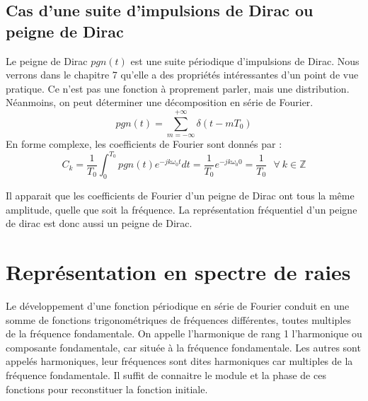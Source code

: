 	

	
	\subsection{Cas d'une suite d'impulsions de Dirac ou peigne de Dirac}
	
	Le peigne de Dirac $pgn(t)$ est une suite périodique d'impulsions de Dirac. Nous verrons dans le chapitre 7 qu'elle a des propriétés intéressantes d'un point de vue pratique. Ce n'est pas une fonction à proprement parler, mais une distribution. Néanmoins, on peut déterminer une décomposition en série de Fourier.
	\begin{equation}\label{exp_peigne_Dirac}
	pgn(t)=\sum_{m=-\infty}^{+\infty}\delta(t-mT_0)
	\end{equation}
	En forme complexe, les coefficients de Fourier sont donnés par :
	\begin{equation}\label{coef_Fourier_peigne_Dirac}
	C_k=\frac{1}{T_0}\int_{0}^{T_0}pgn(t)e^{-jk\omega_{0}t}dt=\frac{1}{T_0}e^{-jk\omega_{0}0}=\frac{1}{T_0}~~~\forall~k \in \mathbb{Z}
	\end{equation}
	
	Il apparait que les coefficients de Fourier d'un peigne de Dirac ont tous la même amplitude, quelle que soit la fréquence. La représentation fréquentiel d'un peigne de dirac est donc aussi un peigne de Dirac. \\
	
	
	
	\section{Représentation en spectre de raies}
	
	Le développement d'une fonction périodique en série de Fourier conduit en une somme de fonctions trigonométriques de fréquences différentes, toutes multiples de la fréquence fondamentale. On appelle l'harmonique de rang 1 l'harmonique ou composante fondamentale, car située à la fréquence fondamentale. Les autres sont appelés harmoniques, leur fréquences sont dites harmoniques car multiples de la fréquence fondamentale. Il suffit de connaitre le module et la phase de ces fonctions pour reconstituer la fonction initiale.
	
